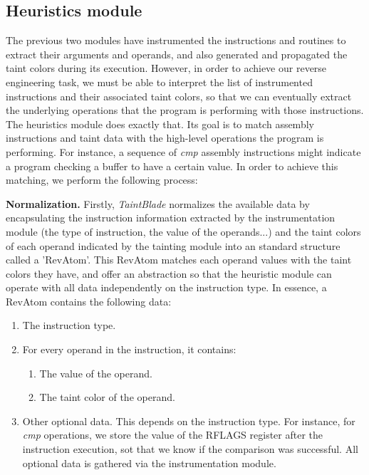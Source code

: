 \documentclass[conference]{IEEEtran}
\begin{document}

\subsection{Heuristics module}
The previous two modules have instrumented the instructions and routines to
extract their arguments and operands, and also generated and propagated the
taint colors during its execution. However, in order to achieve our reverse
engineering task, we must be able to interpret the list of instrumented
instructions and their associated taint colors, so that we can eventually
extract the underlying operations that the program is performing with those
instructions. The heuristics module does exactly that. Its goal is to match
assembly instructions and taint data with the high-level operations the program
is performing. For instance, a sequence of \textit{cmp} assembly instructions
might indicate a program checking a buffer to have a certain value. In order to
achieve this matching, we perform the following process:

\textbf{Normalization.}
Firstly, \textit{TaintBlade} normalizes the available data by encapsulating the instruction information
extracted by the instrumentation module (the type of instruction, the value of the operands...) and the
taint colors of each operand indicated by the tainting module into an standard structure called a 'RevAtom'.
This RevAtom matches each operand values with the taint colors they have, and offer an abstraction
so that the heuristic module can operate with all data independently on the instruction type. In essence,
a RevAtom contains the following data:

\begin{enumerate}
    \item The instruction type.
    \item For every operand in the instruction, it contains:
          \begin{enumerate}
              \item The value of the operand.
              \item The taint color of the operand.
          \end{enumerate}
    \item Other optional data. This depends on the instruction type. For instance, for
          \textit{cmp} operations, we store the value of the RFLAGS register after the
          instruction execution, sot that we know if the comparison was successful. All
          optional data is gathered via the instrumentation module.
\end{enumerate}
\end{document}
